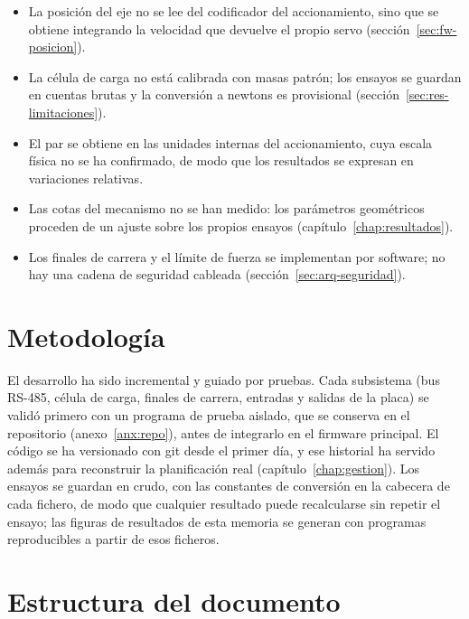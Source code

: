 \begin{itemize}
  \item La posición del eje no se lee del codificador del accionamiento, sino que se obtiene
        integrando la velocidad que devuelve el propio servo (sección~\ref{sec:fw-posicion}).
  \item La célula de carga no está calibrada con masas patrón; los ensayos se guardan en cuentas
        brutas y la conversión a newtons es provisional (sección~\ref{sec:res-limitaciones}).
  \item El par se obtiene en las unidades internas del accionamiento, cuya escala física no se ha
        confirmado, de modo que los resultados se expresan en variaciones relativas.
  \item Las cotas del mecanismo no se han medido: los parámetros geométricos proceden de un ajuste
        sobre los propios ensayos (capítulo~\ref{chap:resultados}).
  \item Los finales de carrera y el límite de fuerza se implementan por software; no hay una cadena
        de seguridad cableada (sección~\ref{sec:arq-seguridad}).
\end{itemize}

\section{Metodología}

El desarrollo ha sido incremental y guiado por pruebas. Cada subsistema (bus RS-485, célula de
carga, finales de carrera, entradas y salidas de la placa) se validó primero con un programa de
prueba aislado, que se conserva en el repositorio (anexo~\ref{anx:repo}), antes de integrarlo en el
firmware principal. El código se ha versionado con git desde el primer día, y ese historial ha
servido además para reconstruir la planificación real (capítulo~\ref{chap:gestion}). Los ensayos se
guardan en crudo, con las constantes de conversión en la cabecera de cada fichero, de modo que
cualquier resultado puede recalcularse sin repetir el ensayo; las figuras de resultados de esta
memoria se generan con programas reproducibles a partir de esos ficheros.

\section{Estructura del documento}

